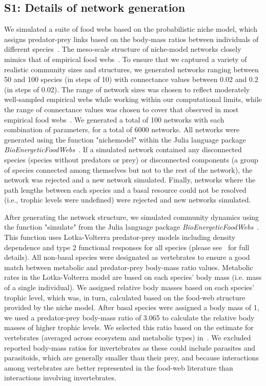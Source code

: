 \documentclass[12pt]{article}
\begin{document}
\clearpage
\begin{spacing}{2.0}
\linenumbers
\section*{S1: Details of network generation}


	We simulated a suite of food webs based on the probabilistic niche model, which assigns predator-prey links based on the body-mass ratios between individuals of different species~\citep{Williams2000,Delmas2017}. The meso-scale structure of niche-model networks closely mimics that of empirical food webs~\citep{Stouffer2007}. To ensure that we captured a variety of realistic community sizes and structures, we generated networks ranging between 50 and 100 species (in steps of 10) with connectance values between 0.02 and 0.2 (in steps of 0.02). The range of network sizes was chosen to reflect moderately well-sampled empirical webs while working within our computational limits, while the range of connectance values was chosen to cover that observed in most empirical food webs~\citep{Dunne2002e}. We generated a total of 100 networks with each combination of parameters, for a total of 6000 networks. All networks were generated using the function "nichemodel" within the Julia language package \emph{BioEnergeticFoodWebs}~\citep{bioenergeticfw,Delmas2017}. If a simulated network contained any disconnected species (species without predators or prey) or disconnected components (a group of species connected among themselves but not to the rest of the network), the network was rejected and a new network simulated. Finally, networks where the path lengths between each species and a basal resource could not be resolved (i.e., trophic levels were undefined) were rejected and new networks simulated.


	After generating the network structure, we simulated community dynamics using the function "simulate" from the Julia language package \emph{BioEnergeticFoodWebs}~\citep{bioenergeticfw,Delmas2017}. This function uses Lotka-Volterra predator-prey models including density dependence and type 2 functional responses for all species (please see~\citet{Delmas2017} for full details).
	All non-basal species were designated as vertebrates to ensure a good match between metabolic and predator-prey body-mass ratio values. Metabolic rates in the Lotka-Volterra model are based on each species' body mass (i.e. mass of a single individual). We assigned relative body masses based on each species' trophic level, which was, in turn, calculated based on the food-web structure provided by the niche model. After basal species were assigned a body mass of 1, we used a predator-prey body-mass ratio of 3.065 to calculate the relative body masses of higher trophic levels. We selected this ratio based on the estimate for vertebrates (averaged across ecosystem and metabolic types) in~\citet{Brose2006}. We excluded reported body-mass ratios for invertebrates as these could include parasites and parasitoids, which are generally smaller than their prey, and because interactions among vertebrates are better represented in the food-web literature than interactions involving invertebrates.
	

\end{spacing}
\end{document}
